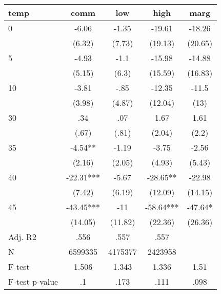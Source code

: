 \documentclass[]{article}
\begin{document}
\begin{tabular}{lcccc} \hline
temp & comm & low & high & marg \\ \hline
0 & -6.06 & -1.35 & -19.61 & -18.26 \\
 & (6.32) & (7.73) & (19.13) & (20.65) \\
5 & -4.93 & -1.1 & -15.98 & -14.88 \\
 & (5.15) & (6.3) & (15.59) & (16.83) \\
10 & -3.81 & -.85 & -12.35 & -11.5 \\
 & (3.98) & (4.87) & (12.04) & (13) \\
30 & .34 & .07 & 1.67 & 1.61 \\
 & (.67) & (.81) & (2.04) & (2.2) \\
35 & -4.54** & -1.19 & -3.75 & -2.56 \\
 & (2.16) & (2.05) & (4.93) & (5.43) \\
40 & -22.31*** & -5.67 & -28.65** & -22.98 \\
 & (7.42) & (6.19) & (12.09) & (14.15) \\
45 & -43.45*** & -11 & -58.64*** & -47.64* \\
 & (14.05) & (11.82) & (22.36) & (26.36) \\
\hline Adj. R2 & .556 & .557 & .557 &  \\
N & 6599335 & 4175377 & 2423958 &  \\
F-test & 1.506 & 1.343 & 1.336 & 1.51 \\
 F-test p-value & .1 & .173 & .111 & .098 \\ \hline
\end{tabular}
\end{document}

